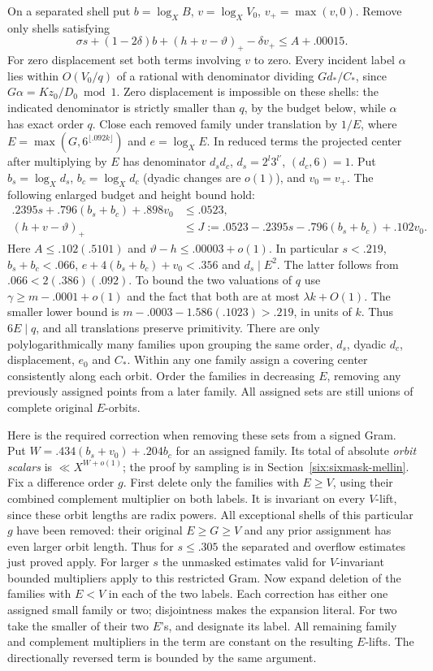 \documentclass[11pt,a4paper]{article}
\theoremstyle{paperplain}
\numberwithin{equation}{section}
\begin{document}
On a separated shell put $b=\log_XB$, $v=\log_XV_0$,
$v_+=\max(v,0)$. Remove only shells satisfying
\[
 \sigma s+(1-2\delta)b+(h+v-\vartheta)_+-\delta v_+
 \le A+.00015 .
\]
For zero displacement set both terms involving $v$ to zero.
Every incident label $\alpha$ lies within $O(V_0/q)$ of a rational
with denominator dividing $G d_*/C_*$, since
$G\alpha=Kz_0/D_0\bmod1$. Zero displacement is impossible on
these shells: the indicated denominator is strictly smaller than
$q$, by the budget below, while $\alpha$ has exact order $q$.
Close each removed family under translation by $1/E$, where
$E=\max(G,6^{\lfloor.092k\rfloor})$ and $e=\log_XE$. In reduced
terms the projected center after multiplying by $E$ has denominator
$d_sd_c$, $d_s=2^l3^{l'}$, $(d_c,6)=1$. Put $b_s=\log_Xd_s$,
$b_c=\log_Xd_c$ (dyadic changes are $o(1)$), and $v_0=v_+$.
The following enlarged budget and height bound hold:
\begin{align}
 .2395s+.796(b_s+b_c)+.898v_0&\le .0523,
 \label{six:sixmask-budget}\\
 (h+v-\vartheta)_+&\le
 J:=.0523-.2395s-.796(b_s+b_c)+.102v_0 .
 \label{six:sixmask-offset}
\end{align}
Here $A\le .102(.5101)$ and $\vartheta-h\le .00003+o(1)$.
In particular $s<.219$, $b_s+b_c<.066$,
$e+4(b_s+b_c)+v_0<.356$ and $d_s\mid E^2$. The latter follows
from $.066<2(.386)(.092)$. To bound the two valuations of $q$
use $\gamma\ge m-.0001+o(1)$ and the fact that both are at most
$\lambda k+O(1)$. The smaller lower bound is
$m-.0003-1.586(.1023)>.219$, in units of $k$. Thus $6E\mid q$,
and all translations preserve primitivity. There are only
polylogarithmically many families upon grouping the same order,
$d_s$, dyadic $d_c$, displacement, $e_0$ and $C_*$. Within
any one family assign a covering center consistently along each
orbit. Order the families in decreasing $E$, removing any previously
assigned points from a later family. All assigned sets are still
unions of complete original $E$-orbits.

Here is the required correction when removing these sets from
a signed Gram. Put $W=.434(b_s+v_0)+.204b_c$ for an assigned
family. Its total of absolute \emph{orbit scalars} is
$\ll X^{W+o(1)}$; the proof by sampling is in
Section~\ref{six:sixmask-mellin}. Fix a difference order $g$. First
delete only the families with $E\ge V$, using their combined
complement multiplier on both labels. It is invariant on every
$V$-lift, since these orbit lengths are radix powers. All exceptional
shells of this particular $g$ have been removed: their original
$E\ge G\ge V$ and any prior assignment has even larger orbit length.
Thus for $s\le.305$ the separated and overflow estimates just
proved apply. For larger $s$ the unmasked estimates valid for
$V$-invariant bounded multipliers apply to this restricted Gram.
Now expand deletion of the families with $E<V$ in each of the two
labels. Each correction has either one assigned small family or
two; disjointness makes the expansion literal. For two take the
smaller of their two $E$'s, and designate its label. All remaining
family and complement multipliers in the term are constant on the
resulting $E$-lifts. The directionally reversed term is bounded
by the same argument.
\end{document}
